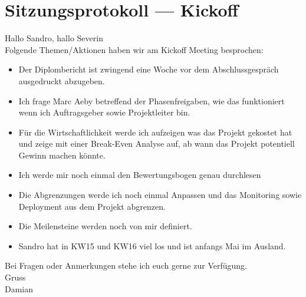 \chapter{Sitzungsprotokoll --- Kickoff}

Hallo Sandro, hallo Severin\\

\noindent
Folgende Themen/Aktionen haben wir am Kickoff Meeting besprochen:

\begin{itemize}
  \item
        Der Diplombericht ist zwingend eine Woche vor dem Abschlussgespräch
        ausgedruckt abzugeben.
  \item
        Ich frage Marc Aeby betreffend der Phasenfreigaben,
        wie das funktioniert wenn ich Auftragsgeber sowie
        Projektleiter bin.
  \item
        Für die Wirtschaftlichkeit werde ich aufzeigen was das
        Projekt gekostet hat und zeige mit einer Break-Even Analyse
        auf, ab wann das Projekt potentiell Gewinn machen könnte.

  \item
        Ich werde mir noch einmal den Bewertungsbogen genau
        durchlesen

  \item
        Die Abgrenzungen werde ich noch einmal Anpassen und das
        Monitoring sowie Deployment aus dem Projekt abgrenzen.

  \item
        Die Meilensteine werden noch von mir definiert.

  \item
        Sandro hat in KW15 und KW16 viel los und ist anfangs Mai im
        Ausland.
\end{itemize}

\noindent
Bei Fragen oder Anmerkungen stehe ich euch gerne zur Verfügung.\\

\noindent
Gruss\\
Damian
